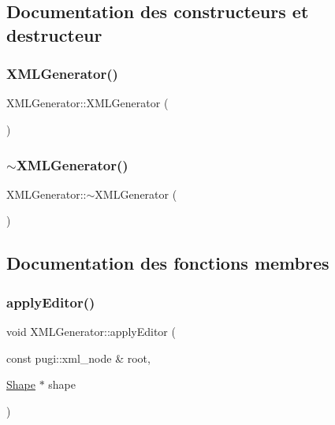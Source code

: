 \subsection{Documentation des constructeurs et destructeur}
\mbox{\label{class_x_m_l_generator_ae88722c986a3d984f0050be10d69e6aa}} 
\subsubsection{\texorpdfstring{X\+M\+L\+Generator()}{XMLGenerator()}}
{\footnotesize\ttfamily X\+M\+L\+Generator\+::\+X\+M\+L\+Generator (\begin{DoxyParamCaption}{ }\end{DoxyParamCaption})}

\mbox{\label{class_x_m_l_generator_a8f947bac9f682ba5a22ccb98ff88ff81}} 
\subsubsection{\texorpdfstring{$\sim$\+X\+M\+L\+Generator()}{~XMLGenerator()}}
{\footnotesize\ttfamily X\+M\+L\+Generator\+::$\sim$\+X\+M\+L\+Generator (\begin{DoxyParamCaption}{ }\end{DoxyParamCaption})}



\subsection{Documentation des fonctions membres}
\mbox{\label{class_x_m_l_generator_a3bd445a70b67303cf5539212ed58928d}} 
\subsubsection{\texorpdfstring{apply\+Editor()}{applyEditor()}}
{\footnotesize\ttfamily void X\+M\+L\+Generator\+::apply\+Editor (\begin{DoxyParamCaption}\item[{const pugi\+::xml\+\_\+node \&}]{root,  }\item[{\hyperlink{class_shape}{Shape} $\ast$}]{shape }\end{DoxyParamCaption})\hspace{0.3cm}{\ttfamily [private]}}



